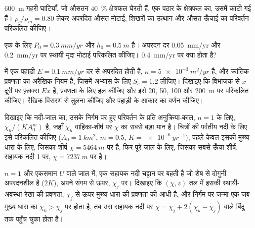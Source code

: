 \begin{exercise}[$\star\star$]\label{exo:b3:quantitative-geomorphology:8}
\qty{600}{m} गहरी घाटियाँ, जो औसतन \qty{40}{\percent} क्षेत्रफल घेरती हैं,
एक पठार के क्षेत्रफल का, उसमें काटी गई हैं। $\rho_c/\rho_m = 0.80$ लेकर
अपरदित औसत मोटाई, शिखरों का उत्थान और
औसत ऊँचाई का परिवर्तन परिकलित कीजिए।
\end{exercise}

\begin{exercise}[$\star\star$]\label{exo:b3:quantitative-geomorphology:9}
एक  के लिए $P_0 = \qty{0.3}{mm/yr}$ और $h_0 =
\qty{0.5}{m}$ है। अपरदन दर
\qty{0.05}{mm/yr} और \qty{0.2}{mm/yr} पर स्थायी मृदा मोटाई परिकलित कीजिए। \qty{0.4}{mm/yr} पर
क्या होता है?
\end{exercise}

\begin{exercise}[$\star\star\star$]\label{exo:b3:quantitative-geomorphology:10}
 में एक पहाड़ी $E = \qty{0.1}{mm/yr}$ दर से अपरदित होती है, $\kappa =
\qty{5e-3}{m^2/yr}$ है, और क्रांतिक प्रवणता का अरैखिक नियम है,
जिसमें अभ्यास के लिए $S_c = 1.2$ लीजिए। दिखाइए कि विभाजक से $x$ दूरी पर फ़्लक्स
$E x$ है, प्रवणता के लिए हल कीजिए और इसे 20, 50, 100 और
\qty{200}{m} पर परिकलित कीजिए। रैखिक विसरण से तुलना कीजिए और पहाड़ी
के आकार का वर्णन कीजिए।
\end{exercise}

\begin{exercise}[$\star\star\star$]\label{exo:b3:quantitative-geomorphology:11}
दिखाइए कि नदी-जाल का, उसके निर्गम पर हुए परिवर्तन के प्रति अनुक्रिया-काल,
$n = 1$ के लिए, $\chi_h/(K A_0^m)$ है, जहाँ $\chi_h$ वाहिका-शीर्ष पर $\chi$ का
सबसे बड़ा मान है। चित्रों की पर्वतीय नदी के लिए इसे परिकलित कीजिए
($A_0 = \qty{1}{km^2}$, $m = 0.5$, $K = \qty{e-6}{yr^{-1}}$), पहले केवल
इसकी मुख्य धारा के लिए, जिसका शीर्ष $\chi = \qty{5464}{m}$ पर है, फिर पूरे जाल के लिए,
जिसका सबसे ऊँचा शीर्ष, सहायक नदी 1 पर, $\chi = \qty{7237}{m}$ पर है।
\end{exercise}

\begin{exercise}[$\star\star\star$]\label{exo:b3:quantitative-geomorphology:12}
$n = 1$ और एकसमान $U$ वाले जाल में, एक सहायक नदी चट्टान पर बहती है जो
शेष से दोगुनी अपरदनशील है ($2K$), अपने संगम से ऊपर, $\chi_j$ पर। दिखाइए कि
$(\chi, z)$ तल में इसकी स्थायी-अवस्था रेखा की प्रवणता, $\chi_j$ से ऊपर
मुख्य धारा की प्रवणता की आधी है, और निर्गम पर जन्मा एक 
जब मुख्य धारा का  $\chi_k > \chi_j$ पर होता है, तब उस सहायक नदी पर
$\chi = \chi_j + 2(\chi_k - \chi_j)$ वाले बिंदु तक पहुँच चुका होता है।
\end{exercise}


